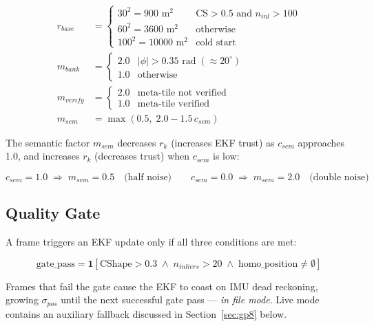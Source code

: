 \documentclass[12pt,a4paper]{article}
\begin{document}
\begin{align}
    r_{base} &=
    \begin{cases}
        30^2 = 900 \text{ m}^2 & \text{CS} > 0.5 \text{ and } n_{inl} > 100 \\
        60^2 = 3600 \text{ m}^2 & \text{otherwise} \\
        100^2 = 10000 \text{ m}^2 & \text{cold start}
    \end{cases} \\[6pt]
    m_{bank} &=
    \begin{cases}
        2.0 & |\phi| > 0.35 \text{ rad} \; (\approx 20^\circ) \\
        1.0 & \text{otherwise}
    \end{cases} \\[6pt]
    m_{verify} &=
    \begin{cases}
        2.0 & \text{meta-tile not verified} \\
        1.0 & \text{meta-tile verified}
    \end{cases} \\[6pt]
    m_{sem} &= \max(0.5,\; 2.0 - 1.5\,c_{sem})
\end{align}

The semantic factor $m_{sem}$ decreases $r_k$ (increases EKF trust) as
$c_{sem}$ approaches 1.0, and increases $r_k$ (decreases trust) when
$c_{sem}$ is low:

\begin{equation}
    c_{sem} = 1.0 \;\Rightarrow\; m_{sem} = 0.5 \quad \text{(half noise)}
    \qquad
    c_{sem} = 0.0 \;\Rightarrow\; m_{sem} = 2.0 \quad \text{(double noise)}
\end{equation}

\subsection{Quality Gate}

A frame triggers an EKF update only if all three conditions are met:

\begin{equation}
    \text{gate\_pass} = \mathbf{1}\!\left[
        \text{CShape} > 0.3 \;\wedge\;
        n_{inliers} > 20 \;\wedge\;
        \text{homo\_position} \neq \emptyset
    \right]
    \label{eq:quality_gate}
\end{equation}

Frames that fail the gate cause the EKF to coast on IMU dead reckoning, growing
$\sigma_{pos}$ until the next successful gate pass --- \emph{in file mode}. Live
mode contains an auxiliary fallback discussed in Section~\ref{sec:gp8} below.
\end{document}
